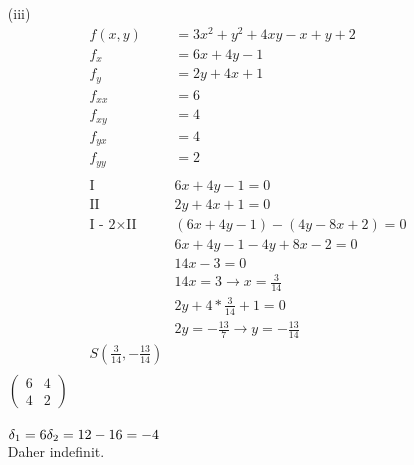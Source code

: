 \documentclass[a4paper,11pt,fleqn]{scrartcl}
\begin{document}
\begin{enumerate}
	 \item[(iii)]
	 \begin{align*}
	 	f(x,y)&=3x^2+y^2+4xy-x+y+2\\
	 	f_{x}&=6x+4y-1\\
	 	f_{y}&=2y+4x+1\\
	 	f_{xx} &= 6\\
		f_{xy} &= 4\\
		f_{yx} &=4\\
		f_{yy} &= 2\\\\
		\text{I }&6x+4y-1=0\\
		\text{II }&2y+4x+1=0\\
		\text{I - 2}\times\text{II}&(6x+4y-1)-(4y-8x+2)=0\\
		&6x+4y-1-4y+8x-2=0\\
		&14x-3=0\\
		&14x=3 \rightarrow x=\frac{3}{14}\\
		&2y+4*\frac{3}{14}+1 =0\\
		&2y= -\frac{13}{7} \rightarrow y =-\frac{13}{14}\\
		S\left(\frac{3}{14},-\frac{13}{14}\right)\\
	 \end{align*}
	 $\left(\begin{matrix}
 		 6 & 4 \\
 		 4 & 2
	 \end{matrix}\right)$\\\\
	 $ \delta_{1}=6\\ \delta_{2}=12-16 = -4$\\
	Daher indefinit.\\
	

\end{enumerate}
\end{document}
